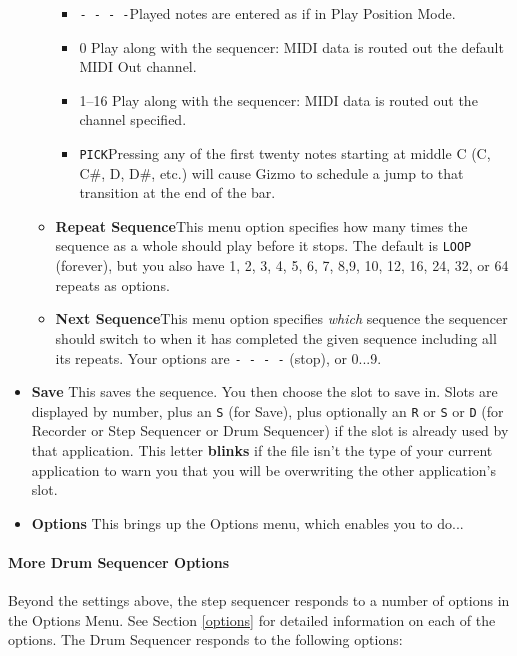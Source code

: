 \documentclass{article}
\begin{document}
\begin{itemize}
\begin{itemize}
 \renewcommand\labelitemiii{$\diamond$}
\begin{itemize}
	\item {\texttt{-~-~-~-}}\quad Played notes are entered as if in Play Position Mode.
	\item {0} \quad Play along with the sequencer: MIDI data is routed out the default MIDI Out channel.
	\item {1--16} \quad Play along with the sequencer: MIDI data is routed out the channel specified.
	\item {\texttt{PICK}}\quad Pressing any of the first twenty notes starting at middle C (C, C\#, D, D\#, etc.) will cause Gizmo to schedule a jump to that transition at the end of the bar.
\end{itemize}

\item {\bf Repeat Sequence}\quad This menu option specifies how many times the sequence as a whole should play before it stops.  The default is {\tt LOOP} (forever), but you also have 1, 2, 3, 4, 5, 6, 7, 8,9, 10, 12, 16, 24, 32, or 64 repeats as options.
\item {\bf Next Sequence}\quad This menu option specifies {\it which} sequence the sequencer should switch to when it has completed the given sequence including all its repeats.  Your options are {\tt - - - -} (stop), or 0...9.
\end{itemize} 

\item {\bf Save} \quad This saves the sequence. You then choose the slot to save in.  Slots are displayed by number, plus an \texttt{S} (for Save), plus optionally an \texttt{R} or \texttt{S} or \texttt{D} (for Recorder or Step Sequencer or Drum Sequencer) if the slot is already used by that application.  This letter {\bf blinks} if the file isn't the type of your current application to warn you that you will be overwriting the other application's slot.

\item {\bf Options} \quad This brings up the Options menu, which enables you to do...
\end{itemize}



\paragraph{More Drum Sequencer Options}

Beyond the settings above, the step sequencer responds to a number of options in the Options Menu.  See Section \ref{options} for detailed information on each of the options.  The Drum Sequencer responds to the following options:
\end{document}
